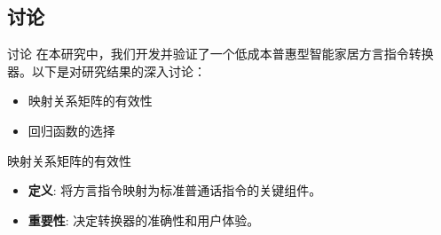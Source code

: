 \documentclass[10pt]{beamer}
\begin{document}
\subsection{讨论}
\begin{frame}{讨论}
在本研究中，我们开发并验证了一个低成本普惠型智能家居方言指令转换器。以下是对研究结果的深入讨论：

\begin{itemize}
    \item 映射关系矩阵的有效性
    \item 回归函数的选择
\end{itemize}
\end{frame}
\begin{frame}{映射关系矩阵的有效性}
    \begin{itemize}
        \item \textbf{定义}: 将方言指令映射为标准普通话指令的关键组件。
        \item \textbf{重要性}: 决定转换器的准确性和用户体验。
    \end{itemize}
    
    \vspace{0.5cm}
    
    
\end{frame}
\end{document}
